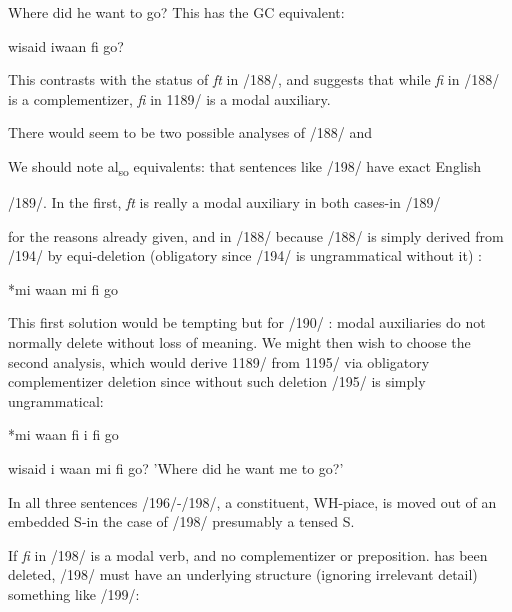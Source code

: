 \ea\label{ex:196}
 Where did he want to go? This has the GC equivalent:
\z

\ea\label{ex:197}
 wisaid iwaan fi go?
\z

This contrasts with the status of \textit{ft} in /188/, and suggests that while
\textit{fi} in /188/ is a complementizer, \textit{fi} in 1189/ is a modal auxiliary.

There would seem to be two possible analyses of /188/ and

We should note al\textsubscript{so} equivalents:
that
sentences
like /198/ have exact English

/189/. In the first, \textit{ft} is really a modal auxiliary in both cases-in /189/

for the reasons already given, and in /188/ because /188/ is simply derived from /194/ by equi{}-deletion (obligatory since /194/ is ungrammatical without it) :

\ea\label{ex:194}
 *mi waan mi fi go
\z

This first solution would be tempting but for /190/ : modal auxiliaries do not normally delete without loss of meaning. We might then wish to choose the second analysis, which would derive 1189/ from 1195/ via obligatory complementizer deletion since without such deletion /195/ is simply ungrammatical:

\ea\label{ex:195}
 *mi waan fi i fi go
\z

\ea\label{ex:198}
 wisaid i waan mi fi go?
\glt 'Where did he want me to go?'
\z



In all three sentences /196/-/198/, a constituent, WH-piace, is moved out of an embedded S-in the case of /198/ presumably a tensed S.

If \textit{fi} in /198/ is a modal verb, and no complementizer or preposition. has been deleted, /198/ must have an underlying structure (ignoring irrelevant detail) something like /199/:

